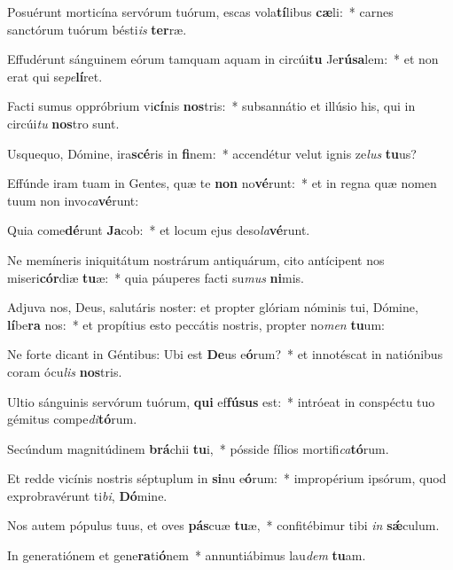 \item Posuérunt morticína servórum tuórum, escas vola\textbf{tí}libus \textbf{cæ}li:~* carnes sanctórum tuórum bésti\textit{is} \textbf{ter}ræ.
\item Effudérunt sánguinem eórum tamquam aquam in circúi\textbf{tu} Je\textbf{rú}\textbf{sa}lem:~* et non erat qui se\textit{pe}\textbf{lí}ret.
\item Facti sumus oppróbrium vi\textbf{cí}nis \textbf{nos}tris:~* subsannátio et illúsio his, qui in circúi\textit{tu} \textbf{nos}tro sunt.
\item Usquequo, Dómine, ira\textbf{scé}ris in \textbf{fi}nem:~* accendétur velut ignis ze\textit{lus} \textbf{tu}us?
\item Effúnde iram tuam in Gentes, quæ te \textbf{non} no\textbf{vé}runt:~* et in regna quæ nomen tuum non invo\textit{ca}\textbf{vé}runt:
\item Quia come\textbf{dé}runt \textbf{Ja}cob:~* et locum ejus deso\textit{la}\textbf{vé}runt.
\item Ne memíneris iniquitátum nostrárum antiquárum, cito antícipent nos miseri\textbf{cór}diæ \textbf{tu}æ:~* quia páuperes facti su\textit{mus} \textbf{ni}mis.
\item Adjuva nos, Deus, salutáris noster: et propter glóriam nóminis tui, Dómine, \textbf{lí}be\textbf{ra} nos:~* et propítius esto peccátis nostris, propter no\textit{men} \textbf{tu}um:
\item Ne forte dicant in Géntibus: Ubi est \textbf{De}us e\textbf{ó}rum?~* et innotéscat in natiónibus coram ócu\textit{lis} \textbf{nos}tris.
\item Ultio sánguinis servórum tuórum, \textbf{qui} ef\textbf{fú}\textbf{sus} est:~* intróeat in conspéctu tuo gémitus compe\textit{di}\textbf{tó}rum.
\item Secúndum magnitúdinem \textbf{brá}chii \textbf{tu}i,~* pósside fílios mortifi\textit{ca}\textbf{tó}rum.
\item Et redde vicínis nostris séptuplum in \textbf{si}nu e\textbf{ó}rum:~* impropérium ipsórum, quod exprobravérunt ti\textit{bi}, \textbf{Dó}mine.
\item Nos autem pópulus tuus, et oves \textbf{pás}cuæ \textbf{tu}æ,~* confitébimur tibi \textit{in} \textbf{sǽ}culum.
\item In generatiónem et gene\textbf{ra}ti\textbf{ó}nem~* annuntiábimus lau\textit{dem} \textbf{tu}am.
